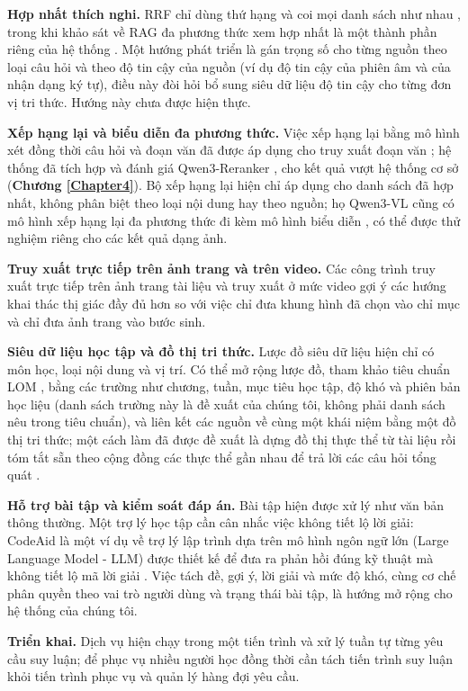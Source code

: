 \bigbreak\noindent
\textbf{Hợp nhất thích nghi.} RRF chỉ dùng thứ hạng và coi mọi danh sách như nhau \cite{cormack2009rrf}, trong khi khảo sát về RAG đa phương thức xem hợp nhất là một thành phần riêng của hệ thống \cite{abootorabi2025ask}. Một hướng phát triển là gán trọng số cho từng nguồn theo loại câu hỏi và theo độ tin cậy của nguồn (ví dụ độ tin cậy của phiên âm và của nhận dạng ký tự), điều này đòi hỏi bổ sung siêu dữ liệu độ tin cậy cho từng đơn vị tri thức. Hướng này chưa được hiện thực.

\bigbreak\noindent
\textbf{Xếp hạng lại và biểu diễn đa phương thức.} Việc xếp hạng lại bằng mô hình xét đồng thời câu hỏi và đoạn văn đã được áp dụng cho truy xuất đoạn văn \cite{nogueira2019passage}; hệ thống đã tích hợp và đánh giá Qwen3-Reranker \cite{zhang2025qwen3embedding}, cho kết quả vượt hệ thống cơ sở (\textbf{Chương \ref{Chapter4}}). Bộ xếp hạng lại hiện chỉ áp dụng cho danh sách đã hợp nhất, không phân biệt theo loại nội dung hay theo nguồn; họ Qwen3-VL cũng có mô hình xếp hạng lại đa phương thức đi kèm mô hình biểu diễn \cite{li2026qwen3vlembedding}, có thể được thử nghiệm riêng cho các kết quả dạng ảnh.

\bigbreak\noindent
\textbf{Truy xuất trực tiếp trên ảnh trang và trên video.} Các công trình truy xuất trực tiếp trên ảnh trang tài liệu \cite{faysse2025colpali, yu2025visrag, tanaka2025vdocrag} và truy xuất ở mức video \cite{jeong2025videorag} gợi ý các hướng khai thác thị giác đầy đủ hơn so với việc chỉ đưa khung hình đã chọn vào chỉ mục và chỉ đưa ảnh trang vào bước sinh.

\bigbreak\noindent
\textbf{Siêu dữ liệu học tập và đồ thị tri thức.} Lược đồ siêu dữ liệu hiện chỉ có môn học, loại nội dung và vị trí. Có thể mở rộng lược đồ, tham khảo tiêu chuẩn LOM \cite{ieee2020lom}, bằng các trường như chương, tuần, mục tiêu học tập, độ khó và phiên bản học liệu (danh sách trường này là đề xuất của chúng tôi, không phải danh sách nêu trong tiêu chuẩn), và liên kết các nguồn về cùng một khái niệm bằng một đồ thị tri thức; một cách làm đã được đề xuất là dựng đồ thị thực thể từ tài liệu rồi tóm tắt sẵn theo cộng đồng các thực thể gần nhau để trả lời các câu hỏi tổng quát \cite{edge2024graphrag}.

\bigbreak\noindent
\textbf{Hỗ trợ bài tập và kiểm soát đáp án.} Bài tập hiện được xử lý như văn bản thông thường. Một trợ lý học tập cần cân nhắc việc không tiết lộ lời giải: CodeAid là một ví dụ về trợ lý lập trình dựa trên mô hình ngôn ngữ lớn (Large Language Model - LLM) được thiết kế để đưa ra phản hồi đúng kỹ thuật mà không tiết lộ mã lời giải \cite{kazemitabaar2024codeaid}. Việc tách đề, gợi ý, lời giải và mức độ khó, cùng cơ chế phân quyền theo vai trò người dùng và trạng thái bài tập, là hướng mở rộng cho hệ thống của chúng tôi.

\bigbreak\noindent
\textbf{Triển khai.} Dịch vụ hiện chạy trong một tiến trình và xử lý tuần tự từng yêu cầu suy luận; để phục vụ nhiều người học đồng thời cần tách tiến trình suy luận khỏi tiến trình phục vụ và quản lý hàng đợi yêu cầu.

